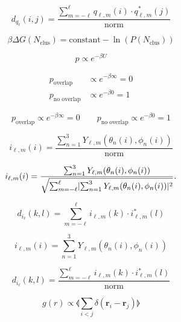 \documentclass[thesis]{subfiles}
\begin{document}
\begin{equation}
d_{q_\ell}(i, j) = \frac{\sum_{m = -\ell}^\ell q_{\ell, m}(i) \cdot q^*_{\ell, m}(j)}{\textrm{norm}}
\end{equation}

\begin{equation}
	\beta \Delta G(N_\textrm{clus}) = \textrm{constant} - \ln(P(N_\textrm{clus}))
\end{equation}

\begin{equation}
	p \propto e^{-\beta U}
\end{equation}

\begin{align}
	p_\textrm{overlap} &\propto e^{-\beta \infty} = 0\\
	p_\textrm{no overlap} &\propto e^{-\beta 0} = 1
\end{align}

\begin{equation}
	p_\textrm{overlap} \propto e^{-\beta \infty} = 0\qquad
	p_\textrm{no overlap} \propto e^{-\beta 0} = 1
\end{equation}

\begin{equation}
i_{\ell, m}(i) = \frac{\sum_{n = 1}^3 Y_{\ell, m}(\theta_n(i), \phi_n(i))}{\textrm{norm}}
\end{equation}

\begin{equation}
i_{\ell, m}(i) = \frac{\sum_{n = 1}^3 Y_{\ell, m}(\theta_n(i), \phi_n(i))}{\sqrt{\sum_{m = -\ell}^\ell \lvert\sum_{n = 1}^3 Y_{\ell, m}(\theta_n(i), \phi_n(i))\rvert^2}}.
\end{equation}

\begin{equation}
d_{i_\ell}(k,l) = \sum_{m = -\ell}^\ell i_{\ell, m}(k) \cdot i^*_{\ell, m}(l)
\end{equation}

\begin{equation}
i_{\ell, m}(i) = \sum_{n = 1}^3 Y_{\ell, m}(\theta_n(i), \phi_n(i))
\end{equation}

\begin{equation}
d_{i_\ell}(k,l) = \frac{\sum_{m = -\ell}^\ell i_{\ell, m}(k) \cdot i^*_{\ell, m}(l)}{\textrm{norm}}
\end{equation}

\begin{equation}
g(r) \propto \llangle \sum_{i < j} \delta(\bm r_i - \bm r_j) \rrangle
\end{equation}
\end{document}
